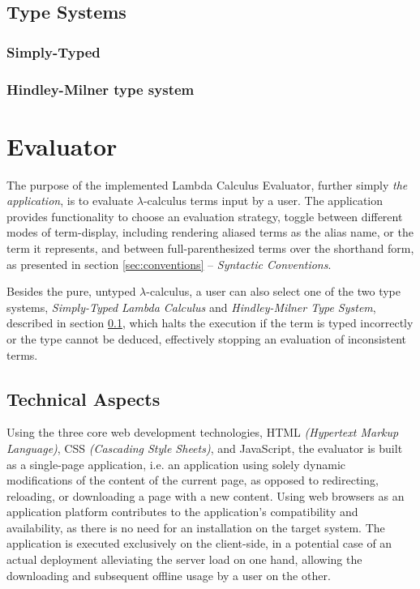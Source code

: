 \documentclass[a4paper,10pt]{article}
\begin{document}
\subsection{Type Systems} \label{sec:types}
\subsubsection{Simply-Typed }
\subsubsection{Hindley-Milner type system}

\section{Evaluator}
The purpose of the implemented Lambda Calculus Evaluator,
further simply \textit{the application}, is to evaluate $\lambda$-calculus
terms input by a user.
The application provides functionality to
choose an evaluation strategy, toggle between different modes
of term-display, including rendering aliased terms as the alias name,
or the term it represents, and between full-parenthesized terms over
the shorthand form, as presented in section \ref{sec:conventions} -- \textit{Syntactic Conventions}.

Besides the pure, untyped $\lambda$-calculus, a user can also select one of the two
type systems, \textit{Simply-Typed Lambda Calculus} and \textit{Hindley-Milner Type System},
described in section \ref{sec:types}, which halts the execution if the term is typed incorrectly or the type cannot
be deduced, effectively stopping an evaluation of inconsistent terms.

\subsection{Technical Aspects}
Using the three core web development technologies,
HTML \textit{(Hypertext Markup Language)}, CSS \textit{(Cascading Style Sheets)}, and JavaScript,
the evaluator is built as a single-page application,
i.e. an application using solely dynamic modifications of the content of the current page,
as opposed to redirecting, reloading, or downloading a page with a new content.
Using web browsers as an application platform contributes
to the application's compatibility and availability, 
as there is no need for an installation on the target system.
The application is executed exclusively on the client-side,
in a potential case of an actual deployment alleviating the server load on one hand,
allowing the downloading and subsequent offline usage by a user on the other.
\end{document}
